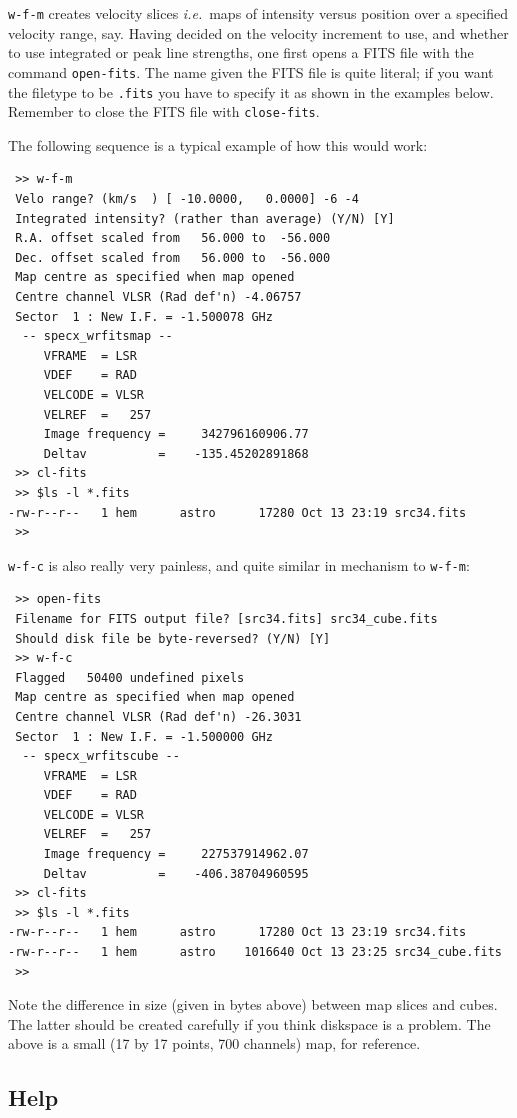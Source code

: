 \documentclass[11pt,twoside]{article}
\newcommand{\ie}{{\it i.e.}}
\begin{document}
{\tt w-f-m} creates velocity slices 
\ie\ maps of intensity versus position over a specified velocity range, say.
Having decided on the velocity increment to use, and whether to use
integrated or peak line strengths, one first opens a FITS file with
the command
\verb|open-fits|. The name given the FITS file is quite literal; if
you want the filetype to be {\tt .fits} you have to specify it as
shown in the examples below. 
Remember to close the FITS file with {\tt close-fits}.

The following sequence is a typical example of how this would work: 

\begin{verbatim}
 >> w-f-m
 Velo range? (km/s  ) [ -10.0000,   0.0000] -6 -4
 Integrated intensity? (rather than average) (Y/N) [Y] 
 R.A. offset scaled from   56.000 to  -56.000
 Dec. offset scaled from   56.000 to  -56.000
 Map centre as specified when map opened
 Centre channel VLSR (Rad def'n) -4.06757    
 Sector  1 : New I.F. = -1.500078 GHz
  -- specx_wrfitsmap --
     VFRAME  = LSR 
     VDEF    = RAD
     VELCODE = VLSR    
     VELREF  =   257
     Image frequency =     342796160906.77
     Deltav          =    -135.45202891868
 >> cl-fits
 >> $ls -l *.fits
-rw-r--r--   1 hem      astro      17280 Oct 13 23:19 src34.fits
 >> 
\end{verbatim}

{\tt w-f-c} is also really very painless, and quite similar in
mechanism to {\tt w-f-m}:
\begin{verbatim}
 >> open-fits
 Filename for FITS output file? [src34.fits] src34_cube.fits
 Should disk file be byte-reversed? (Y/N) [Y] 
 >> w-f-c
 Flagged   50400 undefined pixels
 Map centre as specified when map opened
 Centre channel VLSR (Rad def'n) -26.3031    
 Sector  1 : New I.F. = -1.500000 GHz
  -- specx_wrfitscube --
     VFRAME  = LSR 
     VDEF    = RAD
     VELCODE = VLSR    
     VELREF  =   257
     Image frequency =     227537914962.07
     Deltav          =    -406.38704960595
 >> cl-fits
 >> $ls -l *.fits
-rw-r--r--   1 hem      astro      17280 Oct 13 23:19 src34.fits
-rw-r--r--   1 hem      astro    1016640 Oct 13 23:25 src34_cube.fits
 >>
\end{verbatim}

Note the difference in size (given in bytes above) between map slices
and cubes. The latter should be created carefully if you think
diskspace is a problem. The above is a small (17 by 17 points, 700
channels) map, for reference.

\subsection{Help}
\label{sec:specx_14}
\end{document}
